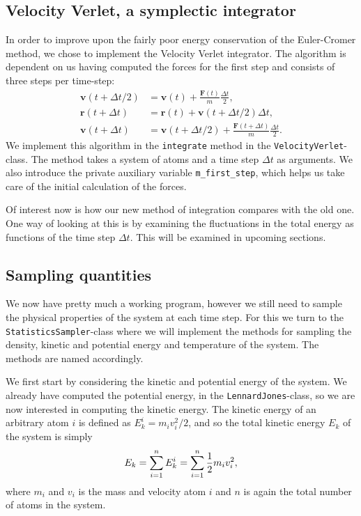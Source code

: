 \documentclass[a4paper]{article}
\renewcommand{\vec}[1]{\mathbf{#1}}
\begin{document}
    \subsection{Velocity Verlet, a symplectic integrator}
    \label{sub:velocity_verlet_a_symplectic_integrator}
    
    In order to improve upon the fairly poor energy conservation of the
    Euler-Cromer method, we chose to implement the Velocity Verlet integrator.
    The algorithm is dependent on us having computed the forces for the first
    step and consists of three steps per time-step:
    \begin{align*}
        \vec{v}(t + \Delta t/2) &= \vec{v}(t) + \frac{\vec{F}(t)}{m}\frac{\Delta t}{2},\\
        \vec{r}(t + \Delta t) &= \vec{r}(t) + \vec{v}(t + \Delta t/2)\Delta t, \\
        \vec{v}(t + \Delta t) &= \vec{v}(t + \Delta t/2) + \frac{\vec{F}(t+\Delta t)}{m} \frac{\Delta t}{2}.
    \end{align*}
    We implement this algorithm in the \texttt{integrate} method in the
    \texttt{VelocityVerlet}-class. The method takes a system of atoms and a
    time step $\Delta t$ as arguments. We also introduce the private auxiliary
    variable \texttt{m\_first\_step}, which helps us take care of the initial
    calculation of the forces.
    
    Of interest now is how our new method of integration compares with the old
    one. One way of looking at this is by examining the fluctuations in the
    total energy as functions of the time step $\Delta t$. This will be
    examined in upcoming sections.
    
    \subsection{Sampling quantities}
    \label{sub:sampling_quantities}
   
    We now have pretty much a working program, however we still need to sample
    the physical properties of the system at each time step. For this we turn
    to the \texttt{StatisticsSampler}-class where we will implement the methods
    for sampling the density, kinetic and potential energy and temperature of
    the system. The methods are named accordingly.
    
    We first start by considering the kinetic and potential energy of the
    system. We already have computed the potential energy, in the
    \texttt{LennardJones}-class, so we are now interested in computing the
    kinetic energy. The kinetic energy of an arbitrary atom $i$ is defined as
    $E_{k}^i = m_iv_i^2/2$, and so the total kinetic energy $E_k$ of the system
    is simply
    \begin{equation}
        \notag
        E_k = \sum^{n}_{i=1} E_k^i = \sum^{n}_{i=1} \frac{1}{2}m_iv_i^2,
    \end{equation}
    where $m_i$ and $v_i$ is the mass and velocity atom $i$ and $n$ is again
    the total number of atoms in the system.
    
\end{document}
